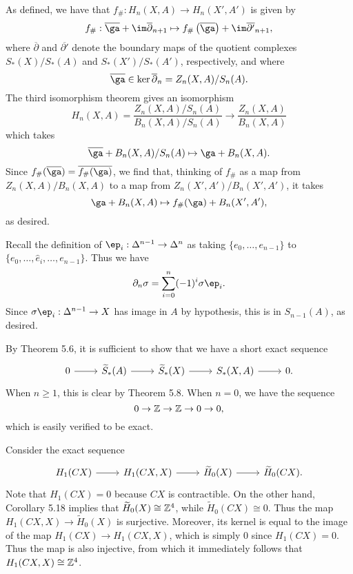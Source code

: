 \documentclass[../../solutions.tex]{subfiles}
\begin{document}
\begin{exercise} \leavevmode
As defined, we have that $f_\#:H_n(X,A)\to H_n(X',A')$ is given by \[f_\#:\overline\ga+\im\overline\partial_{n+1}\mapsto f_\#\left(\overline\ga\right)+\im\overline{\partial'}_{n+1},\] where $\overline\partial$ and $\overline{\partial'}$ denote the boundary maps of the quotient complexes $S_*(X)/S_*(A)$ and $S_*(X')/S_*(A')$, respectively, and where \[\overline\ga\in\ker\overline\partial_n=Z_n(X,A)/S_n(A).\] 
The third isomorphism theorem gives an isomorphism \[H_n(X,A)=\frac{Z_n(X,A)/S_n(A)}{B_n(X,A)/S_n(A)}\to\frac{Z_n(X,A)}{B_n(X,A)}\] which takes \[\overline\ga+B_n(X,A)/S_n(A)\mapsto\ga+B_n(X,A).\] 
Since $f_\#(\overline\ga)=\overline{f_\#(\ga)}$, we find that, thinking of $f_\#$ as a map from $Z_n(X,A)/B_n(X,A)$ to a map from $Z_n(X',A')/B_n(X',A')$, it takes \[\ga+B_n(X,A)\mapsto f_\#(\ga)+B_n(X',A'),\] as desired.
\end{exercise}

\begin{exercise} \leavevmode
Recall the definition of $\ep_i:\Delta^{n-1}\to\Delta^n$ as taking $\{e_0,\dots,e_{n-1}\}$ to $\{e_0,\dots,\hat e_i,\dots,e_{n-1}\}$. 
Thus we have \[\partial_n\sig=\sum_{i=0}^n(-1)^i\sig\ep_i.\]
Since $\sig\ep_i:\Delta^{n-1}\to X$ has image in $A$ by hypothesis, this is in $S_{n-1}(A)$, as desired. 
\end{exercise}

\begin{exercise} \leavevmode
By Theorem 5.6, it is sufficient to show that we have a short exact sequence \[\begin{tikzcd}0\ar[r] & \widetilde S_*(A)\ar[r] & \widetilde S_*(X)\ar[r] & S_*(X,A)\ar[r] & 0.\end{tikzcd}\]
When $n\ge1$, this is clear by Theorem 5.8. 
When $n=0$, we have the sequence \[0\to\mathbb{Z}\to\mathbb{Z}\to0\to0,\] which is easily verified to be exact. 
\end{exercise}

\begin{exercise} \leavevmode
Consider the exact sequence \[\begin{tikzcd}H_1(CX)\ar[r] & H_1(CX,X)\ar[r] & \widetilde H_0(X)\ar[r] & \widetilde H_0(CX).\end{tikzcd}\]
Note that $H_1(CX)=0$ because $CX$ is contractible.
On the other hand, Corollary 5.18 implies that $\widetilde H_0(X)\cong\mathbb{Z}^4$, while $\widetilde H_0(CX)\cong0$. 
Thus the map $H_1(CX,X)\to\widetilde H_0(X)$ is surjective.
Moreover, its kernel is equal to the image of the map $H_1(CX)\to H_1(CX,X)$, which is simply 0 since $H_1(CX)=0$. 
Thus the map is also injective, from which it immediately follows that $H_1(CX,X)\cong\mathbb{Z}^4$. 
\end{exercise}
\end{document}
